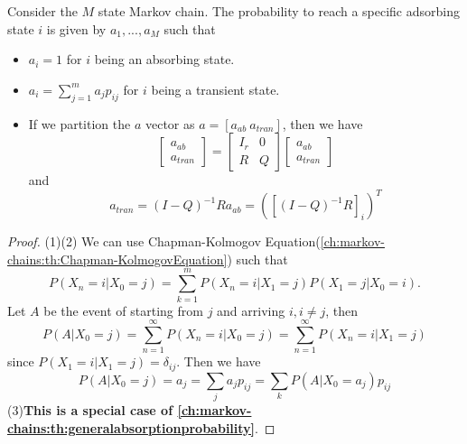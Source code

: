 \begin{refsection}
\begin{lemma}\cite[96]{privault2013understanding}
	Consider the $M$ state Markov chain. The probability  to reach a specific adsorbing state $i$ is given by $a_1,...,a_M$ such that
	\begin{itemize}
		\item $a_i = 1$ for $i$ being an absorbing state.
		\item $a_i = \sum_{j=1}^m a_jp_{ij}$ for $i$ being a transient state. 
		\item If we partition the $a$ vector as $a = [a_{ab} ~a_{tran}]$, then we have
		$$\begin{bmatrix}
		a_{ab}\\
		a_{tran}
		\end{bmatrix} =\begin{bmatrix}
		I_r & 0 \\ R & Q
		\end{bmatrix} \begin{bmatrix}
		a_{ab}\\
		a_{tran}
		\end{bmatrix}$$
		and
		$$a_{tran} = (I-Q)^{-1}Ra_{ab} = ([(I-Q)^{-1}R]_i)^T$$
	\end{itemize}
\end{lemma}
\begin{proof}
	(1)(2) 
	We can use Chapman-Kolmogov Equation(\autoref{ch:markov-chains:th:Chapman-KolmogovEquation}) such that
	$$P(X_n = i|X_0 = j) = \sum_{k=1}^m P(X_n = i|X_1 = j)P(X_1 = j|X_0 = i).$$
	Let $A$ be the event of starting from $j$ and arriving $i, i\neq j$, then
	$$P(A|X_0=j) = \sum_{n=1}^\infty P(X_n = i|X_0 = j) = \sum_{n=1}^\infty P(X_n = i|X_1 = j)$$
	since $P(X_1=i|X_1=j)=\delta_{ij}$. 
	Then we have
	$$P(A|X_0 = j) =a_j= \sum_j a_jp_{ij} = \sum_k P(A|X_0 = a_j)p_{ij} $$
	(3)\textbf{This is a special case of \autoref{ch:markov-chains:th:generalabsorptionprobability}}.
\end{proof}




\end{refsection}
